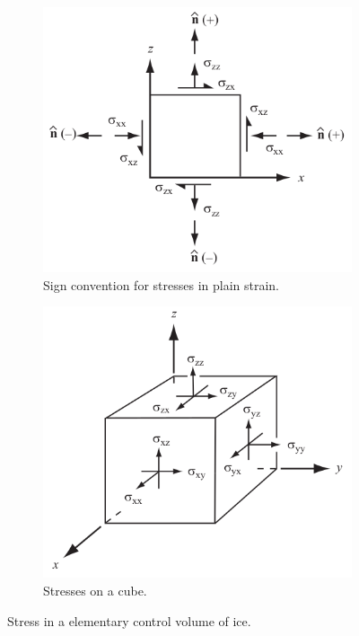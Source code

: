 \documentclass{article}
\begin{document}
\begin{figure}[!h]
	\centering
	\begin{subfigure}{.5\textwidth}
		\centering
		\includegraphics[width=0.99\linewidth]{../fig/Stress_2D.png}
		\caption{Sign convention for stresses in plain strain.}
		\label{Stress2D}
	\end{subfigure}%
	\begin{subfigure}{.5\textwidth}
		\centering
		\includegraphics[width=0.99\linewidth]{../fig/Stress_tensor.png}
		\caption{Stresses on a cube.}
		\label{Stress_tensor}
	\end{subfigure}
	\caption{Stress in a elementary control volume of ice.}
	\label{Stress}
\end{figure}
\end{document}
